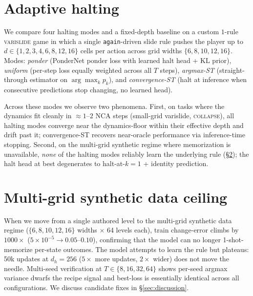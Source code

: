\section{Adaptive halting}
\label{app:halting}

We compare four halting modes and a fixed-depth baseline on a custom
$1$-rule \textsc{varislide} game in which a single \texttt{again}-driven
slide rule pushes the player up to $d \in \{1, 2, 3, 4, 6, 8, 12, 16\}$
cells per action across grid widths $\{6, 8, 10, 12, 16\}$. Modes:
\emph{ponder} (PonderNet ponder loss with learned halt head + KL
prior), \emph{uniform} (per-step loss equally weighted across all
$T$ steps), \emph{argmax-ST} (straight-through estimator on
$\arg\max_k p_k$), and \emph{convergence-ST} (halt at inference when
consecutive predictions stop changing, no learned head).


Across these modes we observe two phenomena. First, on tasks where
the dynamics fit cleanly in $\approx 1$--$2$ NCA steps (small-grid
varislide, \textsc{collapse}), all halting modes converge near the
dynamics-floor within their effective depth and drift past it;
convergence-ST recovers near-oracle performance via inference-time
stopping. Second, on the multi-grid synthetic regime where
memorization is unavailable, \emph{none} of the halting modes
reliably learn the underlying rule (\S\ref{app:ceiling}); the halt
head at best degenerates to halt-at-$k{=}1$ + identity prediction.

\section{Multi-grid synthetic data ceiling}
\label{app:ceiling}

When we move from a single authored level to the multi-grid synthetic
data regime ($\{6,8,10,12,16\}$ widths $\times$ 64 levels each),
train change-error climbs by $1000\times$
($5 \times 10^{-5} \to 0.05$--$0.10$), confirming that the model can
no longer 1-shot-memorize per-state outcomes. The model attempts to
learn the rule but plateaus: 50k updates at $d_h{=}256$ ($5\times$
more updates, $2\times$ wider) does not move the needle. Multi-seed
verification at $T \in \{8, 16, 32, 64\}$ shows per-seed argmax
variance dwarfs the recipe signal and best-loss is essentially
identical across all configurations. We discuss candidate fixes in
\S\ref{sec:discussion}.

